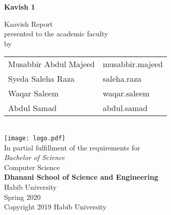 \begin{titlepage}
  
  \begin{center}
    \vfill
    \textbf{\Huge Kavish 1}
    \bigskip

    {\large Kaavish Report\\
      presented to the academic faculty\\
      by\\\bigskip
      \begin{tabular}{ll}
        Musabbir Abdul Majeed & musabbir.majeed\\
        Syeda Saleha Raza & saleha.raza\\
        Waqar Saleem & waqar.saleem\\
        Abdul Samad & abdul.samad\\
      \end{tabular}
    }\\\vfill
    \texttt{[image: logo.pdf]}\\
    {\large In partial fulfillment of the requirements for\\
      \textit{Bachelor of Science}\\
      Computer Science\\\medskip
      \textbf{Dhanani School of Science and Engineering}\\\medskip
      Habib University\\\smallskip
      Spring 2020
    }\\\vfill
    Copyright {\scriptsize \textcopyright} 2019 Habib University
  \end{center}
  \restoregeometry
\end{titlepage}

